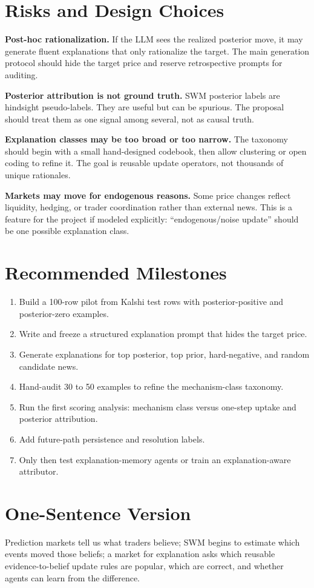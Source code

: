 \documentclass[11pt]{article}
\begin{document}
\section{Risks and Design Choices}
\textbf{Post-hoc rationalization.} If the LLM sees the realized posterior move, it may generate fluent explanations that only rationalize the target. The main generation protocol should hide the target price and reserve retrospective prompts for auditing.

\textbf{Posterior attribution is not ground truth.} SWM posterior labels are hindsight pseudo-labels. They are useful but can be spurious. The proposal should treat them as one signal among several, not as causal truth.

\textbf{Explanation classes may be too broad or too narrow.} The taxonomy should begin with a small hand-designed codebook, then allow clustering or open coding to refine it. The goal is reusable update operators, not thousands of unique rationales.

\textbf{Markets may move for endogenous reasons.} Some price changes reflect liquidity, hedging, or trader coordination rather than external news. This is a feature for the project if modeled explicitly: ``endogenous/noise update'' should be one possible explanation class.

\section{Recommended Milestones}
\begin{enumerate}
\item Build a 100-row pilot from Kalshi test rows with posterior-positive and posterior-zero examples.
\item Write and freeze a structured explanation prompt that hides the target price.
\item Generate explanations for top posterior, top prior, hard-negative, and random candidate news.
\item Hand-audit 30 to 50 examples to refine the mechanism-class taxonomy.
\item Run the first scoring analysis: mechanism class versus one-step uptake and posterior attribution.
\item Add future-path persistence and resolution labels.
\item Only then test explanation-memory agents or train an explanation-aware attributor.
\end{enumerate}

\section{One-Sentence Version}
Prediction markets tell us what traders believe; SWM begins to estimate which events moved those beliefs; a market for explanation asks which reusable evidence-to-belief update rules are popular, which are correct, and whether agents can learn from the difference.
\end{document}
